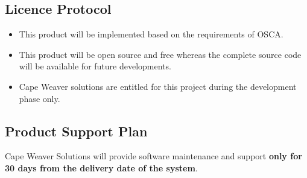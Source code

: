 \documentclass[12pt,a4paper]{article}
\begin{document}
\subsection{Licence Protocol}
\vspace{12pt}

\begin{itemize}
    \item This product will be implemented based on the requirements of OSCA.
    \item This product will be open source and free whereas the complete source code will be available for future developments.
    \item Cape Weaver solutions are entitled for this project during the development phase only.
\end{itemize}
\vspace{12pt}



\subsection{Product Support Plan}
\vspace{12pt}

Cape Weaver Solutions will provide software maintenance and support \textbf{only for 30 days from the delivery date of the system}.
\vspace{12pt}
\end{document}
